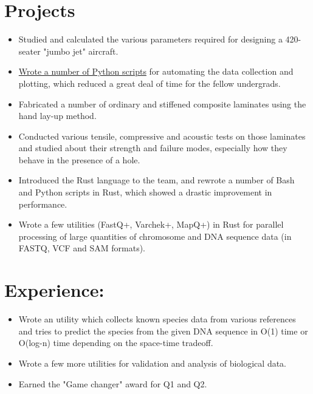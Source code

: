 \documentclass[11pt,a4paper,sans]{moderncv}        %
\newcommand\chref[3][linky]{\href{#2}{\color{#1}#3}}
\begin{document}
\section{Projects}
{\begin{itemize}
\item Studied and calculated the various parameters required for designing a 420-seater "jumbo jet" aircraft.
\item \chref{https://github.com/Wafflespeanut/scripts/tree/5610248de2d47311f128fecd015e2af8becca26f/python/Course}{Wrote a number of Python scripts} for automating the data collection and plotting, which reduced a great deal of time for the fellow undergrads.
\end{itemize}}
{\begin{itemize}
\item Fabricated a number of ordinary and stiffened composite laminates using the hand lay-up method.
\item Conducted various tensile, compressive and acoustic tests on those laminates and studied about their strength and failure modes, especially how they behave in the presence of a hole.
\end{itemize}}
{\begin{itemize}
\item Introduced the Rust language to the team, and rewrote a number of Bash and Python scripts in Rust, which showed a drastic improvement in performance.
\item Wrote a few utilities (FastQ+, Varchek+, MapQ+) in Rust for parallel processing of large quantities of chromosome and DNA sequence data (in FASTQ, VCF and SAM formats).
\end{itemize}}

\section{Experience:}
{\begin{itemize}
\item Wrote an utility which collects known species data from various references and tries to predict the species from the given DNA sequence in O(1) time or O(log-n) time depending on the space-time tradeoff.
\item Wrote a few more utilities for validation and analysis of biological data.
\item Earned the "Game changer" award for Q1 and Q2.
\end{itemize}}
\end{document}
